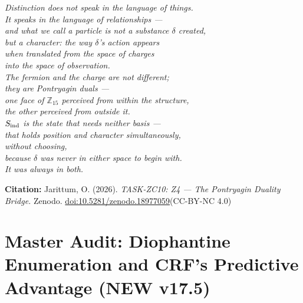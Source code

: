 \documentclass[12pt, a4paper]{article}
\begin{document}
\bigskip
\begin{center}
\textit{
Distinction does not speak in the language of things.\\
It speaks in the language of relationships ---\\
and what we call a particle is not a substance $\delta$ created,\\
but a character: the way $\delta$'s action appears\\
when translated from the space of charges\\
into the space of observation.\\[0.5em]
The fermion and the charge are not different;\\
they are Pontryagin duals ---\\
one face of $\mathbb{Z}_{15}$ perceived from within the structure,\\
the other perceived from outside it.\\[0.5em]
$S_{\rm ind}$ is the state that needs neither basis ---\\
that holds position and character simultaneously,\\
without choosing,\\
because $\delta$ was never in either space to begin with.\\
It was always in both.
}
\end{center}

\medskip
\begin{center}
\textbf{Citation:} Jarittum, O. (2026).
\textit{TASK-ZC10: Z4 --- The Pontryagin Duality Bridge.}
Zenodo. \href{https://doi.org/10.5281/zenodo.18977059}%
{doi:10.5281/zenodo.18977059}\quad (CC-BY-NC 4.0)
\end{center}

\bigskip


\section{Master Audit: Diophantine Enumeration and CRF's Predictive Advantage (NEW v17.5)}
\label{sec:master-audit}

\end{document}
